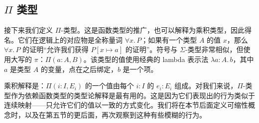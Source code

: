 \documentclass{ctexrep}
\theoremstyle{plain}
\theoremstyle{definition}
\theoremstyle{remark}
\theoremstyle{definition}
\theoremstyle{definition}
\theoremstyle{definition}
\begin{document}
\subsection{$\Pi$ 类型}

接下来我们定义 $\Pi$-类型。这是函数类型的推广，也可以解释为乘积类型，因此得名。它们在逻辑上的对应物是全称量词 $\forall x.\,P$；如果有一个类型 $A$ 的值 $x$，那么 $\forall x.\,P$ 的证明“允许我们获得 $P[x\mapsto a]$ 的证明”。符号与 $\Sigma$-类型非常相似，但使用大写的 $\pi$：$\Pi(a:A,B)$。该类型的值使用经典的 lambda 表示法 $\lambda a:A.\,b$，其中 $a$ 是类型 $A$ 的变量，点在之后绑定，$b$ 是一个项。

乘积解释是：$\Pi(i:I,E_i)$ 的一个值由每个 $i:I$ 的 $e_i:E_i$ 组成。对我们来说，$\Pi$-类型作为依赖函数类型的类型论解释是最有用的。这是因为它们表现出的行为类似于连续映射——只允许它们的值以一致的方式变化。我们将在本节后面定义可缩性概念时，以及在第五节的更后面，再次观察到这种有些模糊的行为。
\end{document}
